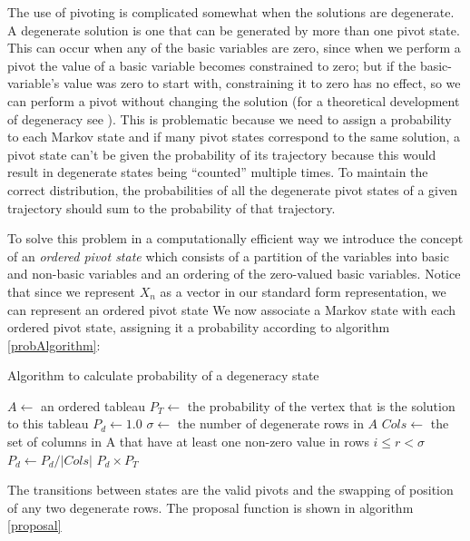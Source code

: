 \documentclass{article}
\begin{document}
The use of pivoting is complicated somewhat when the solutions are degenerate. A degenerate solution is one that can be generated by more than one pivot state. This can occur when any of the basic variables are zero, since when we perform a pivot the value of a basic variable becomes constrained to zero; but if the basic-variable's value was zero to start with, constraining it to zero has no effect, so we can perform a pivot without changing the solution (for a theoretical development of degeneracy see \cite{zornig93degeneracy}). This is problematic because we need to assign a probability to each Markov state and if many pivot states correspond to the same solution, a pivot state can't be given the probability of its trajectory because this would result in degenerate states being ``counted'' multiple times. To maintain the correct distribution, the probabilities of all the degenerate pivot states of a given trajectory should sum to the probability of that trajectory.

To solve this problem in a computationally efficient way we introduce the concept of an \textit{ordered pivot state} which consists of a partition of the variables into basic and non-basic variables and an ordering of the zero-valued basic variables. Notice that since we represent $X_n$ as a vector in our standard form representation, we can represent an ordered pivot state We now associate a Markov state with each ordered pivot state, assigning it a probability according to algorithm \ref{probAlgorithm}:

\begin{algorithm}
\caption{Algorithm to calculate probability of a degeneracy state}
\label{probAlgorithm}
\begin{algorithmic}
\State $A \leftarrow$ an ordered tableau
\State $P_T \leftarrow$ the probability of the vertex that is the solution to this tableau
\State $P_d \leftarrow 1.0$
\State $\sigma \leftarrow$ the number of degenerate rows in $A$
	\State $Cols \leftarrow$ the set of columns in A that have at least one non-zero value in rows $i \le r < \sigma$
	\State $P_d \leftarrow P_d/|Cols|$
\EndFor
\State \Return $P_d \times P_T$
\end{algorithmic}
\end{algorithm}

The transitions between states are the valid pivots and the swapping of position of any two degenerate rows. The proposal function is shown in algorithm \ref{proposal}
\end{document}
